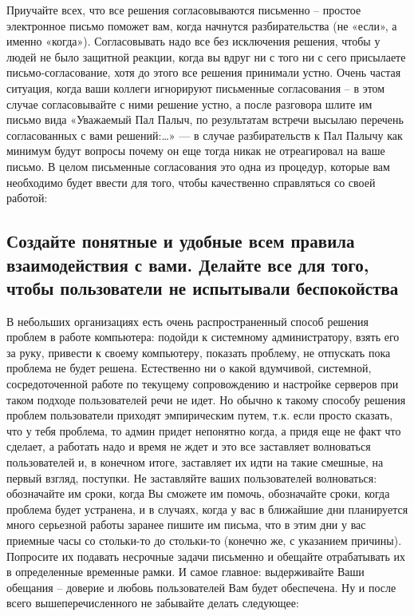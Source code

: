 	Приучайте всех, что все решения согласовываются письменно – простое электронное письмо поможет вам, когда начнутся разбирательства (не «если», а именно «когда»). Согласовывать надо все без исключения решения, чтобы у людей не было защитной реакции, когда вы вдруг ни с того ни с сего присылаете письмо-согласование, хотя до этого все решения принимали устно. Очень частая ситуация, когда ваши коллеги игнорируют письменные согласования – в этом случае согласовывайте с ними решение устно, а после разговора шлите им письмо вида «Уважаемый Пал Палыч, по результатам встречи высылаю перечень согласованных с вами решений:…» — в случае разбирательств к Пал Палычу как минимум будут вопросы почему он еще тогда никак не отреагировал на ваше письмо. В целом письменные согласования это одна из процедур, которые вам необходимо будет ввести для того, чтобы качественно справляться со своей работой:
	
	\subsection{Создайте понятные и удобные всем правила взаимодействия с вами. Делайте все для того, чтобы пользователи не испытывали беспокойства}
	
	В небольших организациях есть очень распространенный способ решения проблем в работе компьютера: подойди к системному администратору, взять его за руку, привести к своему компьютеру, показать проблему, не отпускать пока проблема не будет решена. Естественно ни о какой вдумчивой, системной, сосредоточенной работе по текущему сопровождению и настройке серверов при таком подходе пользователей речи не идет. Но обычно к такому способу решения проблем пользователи приходят эмпирическим путем, т.к. если просто сказать, что у тебя проблема, то админ придет непонятно когда, а придя еще не факт что сделает, а работать надо и время не ждет и это все заставляет волноваться пользователей и, в конечном итоге, заставляет их идти на такие смешные, на первый взгляд, поступки. Не заставляйте ваших пользователей волноваться: обозначайте им сроки, когда Вы сможете им помочь, обозначайте сроки, когда проблема будет устранена, и в случаях, когда у вас в ближайшие дни планируется много серьезной работы заранее пишите им письма, что в этим дни у вас приемные часы со стольки-то до стольки-то (конечно же, с указанием причины). Попросите их подавать несрочные задачи письменно и обещайте отрабатывать их в определенные временные рамки. И самое главное: выдерживайте Ваши обещания – доверие и любовь пользователей Вам будет обеспечена.
	Ну и после всего вышеперечисленного не забывайте делать следующее:
	
